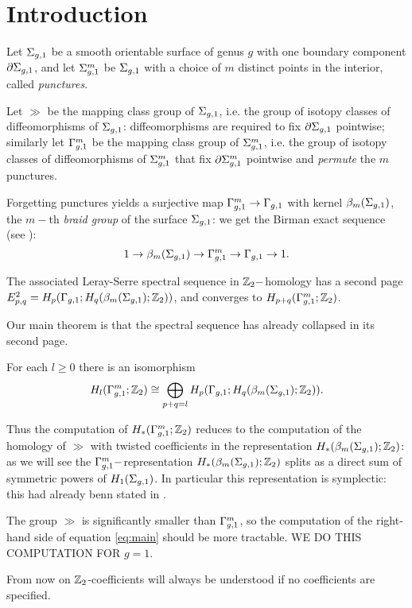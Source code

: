 \section{Introduction}
Let $\Sigma_{g,1}$ be a smooth orientable surface of genus $g$ with one boundary component $\partial\Sigma_{g,1}$, and let $\Sigma_{g,1}^m$ be $\Sigma_{g,1}$ with
a choice of $m$ distinct points in the interior, called \emph{punctures}.

Let $\gg$ be the mapping class group of $\Sigma_{g,1}$, i.e. the group of isotopy classes of diffeomorphisms of $\Sigma_{g,1}$:
diffeomorphisms are required to fix $\partial\Sigma_{g,1}$ pointwise; similarly let $\Gamma_{g,1}^m$ be the mapping class group of $\Sigma_{g,1}^m$, i.e.
the group of isotopy classes of diffeomorphisms of $\Sigma_{g,1}^m$ that fix $\partial\Sigma_{g,1}^m$ pointwise and \emph{permute} the $m$ punctures.

Forgetting punctures yields a surjective map $\Gamma_{g,1}^m\to\Gamma_{g,1}$ with kernel $\beta_{m}(\Sigma_{g,1})$,
the $m-$th \emph{braid group} of the surface $\Sigma_{g,1}$: we get the Birman exact sequence (see \cite{Birman:mcgbr}):
\begin{equation}
\label{eq:Birman}
1\to\beta_{m}(\Sigma_{g,1})\to\Gamma_{g,1}^m\to\Gamma_{g,1}\to 1.
\end{equation}

The associated Leray-Serre spectral sequence in $\mathbb{Z}_2-$homology has a second page $E^2_{p,q}=H_p(\Gamma_{g,1};H_q(\beta_{m}(\Sigma_{g,1});\mathbb{Z}_2))$,
and converges to $H_{p+q}(\Gamma_{g,1}^m;\mathbb{Z}_2)$.

Our main theorem is that the spectral sequence has already collapsed in its second page.
\begin{thm}
\label{thm:main}
For each $l\geq 0$ there is an isomorphism
\begin{equation}
\label{eq:main}
 H_l(\Gamma_{g,1}^m;\mathbb{Z}_2)\cong \bigoplus_{p+q=l} H_p(\Gamma_{g,1};H_q(\beta_{m}(\Sigma_{g,1});\mathbb{Z}_2)).
\end{equation}
\end{thm}
Thus the computation of $H_*(\Gamma_{g,1}^m;\mathbb{Z}_2)$ reduces to the computation of the homology of $\gg$ with
twisted coefficients in the representation $H_*(\beta_{m}(\Sigma_{g,1});\mathbb{Z}_2)$: as we will see the $\Gamma_{g,1}^m-$representation
$H_*(\beta_{m}(\Sigma_{g,1});\mathbb{Z}_2)$ splits as a direct sum of symmetric powers of $H_1(\Sigma_{g,1})$.
In particular this representation is symplectic: this had already benn stated in \cite{LM}.

The group $\gg$ is significantly smaller than $\Gamma_{g,1}^m$, so the
computation of the right-hand side of equation \ref{eq:main}
should be more tractable.
WE DO THIS COMPUTATION FOR $g=1$.

From now on $\mathbb{Z}_2$-coefficients will always be understood if no coefficients are specified.
